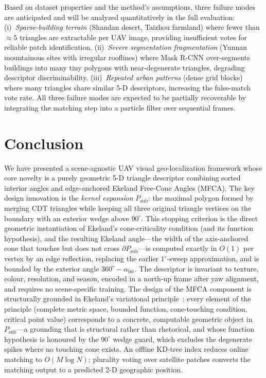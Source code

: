 \documentclass[10pt]{article}
\theoremstyle{plain}
\theoremstyle{definition}
\begin{document}
Based on dataset properties and the method's assumptions, three failure modes
are anticipated and will be analyzed quantitatively in the full evaluation:
(i)~\emph{Sparse-building terrain} (Shandan desert, Taizhou farmland) where
fewer than ${\approx}5$ triangles are extractable per UAV image, providing
insufficient votes for reliable patch identification.
(ii)~\emph{Severe segmentation fragmentation} (Yunnan mountainous sites with
irregular rooflines) where Mask R-CNN over-segments buildings into many tiny
polygons with near-degenerate triangles, degrading descriptor discriminability.
(iii)~\emph{Repeated urban patterns} (dense grid blocks) where many triangles
share similar 5-D descriptors, increasing the false-match vote rate.
All three failure modes are expected to be partially recoverable by integrating
the matching step into a particle filter over sequential frames.

\section{Conclusion}
\label{sec:conclusion}

We have presented a scene-agnostic UAV visual geo-localization framework
whose core novelty is a purely geometric 5-D triangle descriptor combining
sorted interior angles and edge-anchored Ekeland Free-Cone Angles (MFCA).
The key design innovation is the \emph{kernel expansion} $P_{\mathrm{sub}}$:
the maximal polygon formed by merging CDT triangles while keeping all three
original triangle vertices on the boundary with an exterior wedge above
$90^\circ$.
This stopping criterion is the direct geometric instantiation of Ekeland's
cone-criticality condition (and its function hypothesis), and the resulting
Ekeland angle---the width of the axis-anchored cone that touches but does not
cross $\partial P_{\mathrm{sub}}$---is computed exactly in $O(1)$ per vertex by
an edge reflection, replacing the earlier $1^\circ$-sweep approximation, and is
bounded by the exterior angle $360^\circ-\alpha_{\mathrm{int}}$.
The descriptor is invariant to texture, colour, resolution, and season,
encoded in a north-up frame after yaw alignment, and requires no scene-specific
training.
The design of the MFCA component is structurally grounded in Ekeland's
variational principle~\cite{ekeland1974}: every element of the principle
(complete metric space, bounded function, cone-touching condition, critical
point value) corresponds to a concrete, computable geometric object in
$P_{\mathrm{sub}}$---a grounding that is structural rather than rhetorical,
and whose function hypothesis is honoured by the $90^\circ$ wedge guard, which
excludes the degenerate spikes where no touching cone exists.
An offline KD-tree index reduces online matching to $O(M\log N)$; plurality
voting over satellite patches converts the matching output to a predicted 2-D
geographic position.
\end{document}
